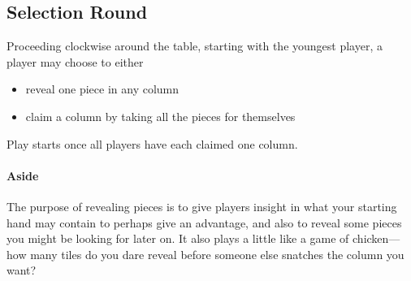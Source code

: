 \subsection{Selection Round}

Proceeding clockwise around the table, starting with the youngest player, a player may choose to either 
\begin{itemize} 
\item reveal one piece in any column
\item claim a column by taking all the pieces for themselves
\end{itemize}
Play starts once all players have each claimed one column.

\paragraph{Aside} The purpose of revealing pieces is to give players insight in what your starting hand may contain to perhaps give an advantage, and also to reveal some pieces you might be looking for later on. It also plays a little like a game of chicken---how many tiles do you dare reveal before someone else snatches the column you want?